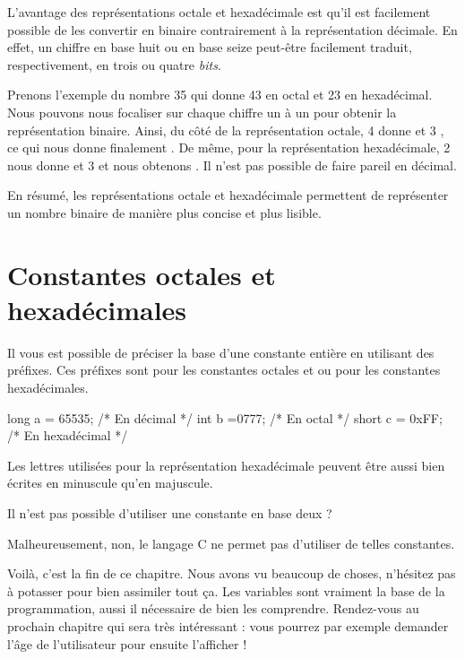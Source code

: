 L'avantage des représentations octale et hexadécimale est qu'il est
facilement possible de les convertir en binaire contrairement à la
représentation décimale. En effet, un chiffre en base huit ou en base
seize peut-être facilement traduit, respectivement, en trois ou quatre
\emph{bits}.

Prenons l'exemple du nombre 35 qui donne 43 en octal et 23 en
hexadécimal. Nous pouvons nous focaliser sur chaque chiffre un à un
pour obtenir la représentation binaire. Ainsi, du côté de la
représentation octale, 4 donne  et 3 , ce qui
nous donne finalement . De même, pour la
représentation hexadécimale, 2 nous donne  et 3
 et nous obtenons . Il n'est pas possible
de faire pareil en décimal.

En résumé, les représentations octale et hexadécimale permettent de
représenter un nombre binaire de manière plus concise et plus lisible.

\section{Constantes octales et
hexadécimales}\label{constantes-octales-et-hexaduxe9cimales}

Il vous est possible de préciser la base d'une constante entière en
utilisant des préfixes. Ces préfixes sont  pour les
constantes octales et  ou  pour les constantes
hexadécimales.

\begin{C}
long a = 65535; /* En décimal */
int b =0777; /* En octal */
short c = 0xFF; /* En hexadécimal */
\end{C}

\begin{infobox}
  Les lettres utilisées pour la représentation hexadécimale peuvent
  être aussi bien écrites en minuscule qu'en majuscule.
\end{infobox}


\begin{questionbox}
  Il n'est pas possible d'utiliser une constante en base deux ?
\end{questionbox}

Malheureusement, non, le langage C ne permet pas d'utiliser de telles
constantes.

\hrulefill
    
Voilà, c'est la fin de ce chapitre. Nous avons vu beaucoup de choses,
n'hésitez pas à potasser pour bien assimiler tout ça. Les variables
sont vraiment la base de la programmation, aussi il nécessaire de bien
les comprendre. Rendez-vous au prochain chapitre qui sera très
intéressant : vous pourrez par exemple demander l'âge de l'utilisateur
pour ensuite l'afficher !